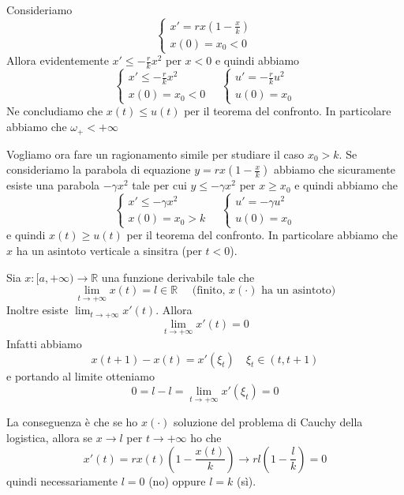 \begin{example}
    Consideriamo 
    \[
        \begin{cases}
        x' = rx\left( 1 - \frac{x}{k} \right)  \\
        x(0) = x_{0} < 0
        \end{cases}
    \]
    Allora evidentemente \(x' \le -\frac{r}{k} x^2\) per \(x < 0\) e quindi
    abbiamo
    \[
        \begin{cases}
            x' \le  -\frac{r}{k} x^2 \\
            x(0) = x_{0} < 0
        \end{cases}
        \quad 
        \begin{cases}
            u' =  -\frac{r}{k} u^2 \\
            u(0) = x_{0}
        \end{cases}
    \]
    Ne concludiamo che \(x(t) \le u(t)\) per il teorema del confronto. In
    particolare abbiamo che \(\omega_+ < +\infty\) 

    Vogliamo ora fare un ragionamento simile per studiare il caso \(x_{0} > k\).
    Se consideriamo la parabola di equazione \(y = rx(1-\frac{x}{k})\) abbiamo
    che sicuramente esiste una parabola \(-\gamma x^2\) tale per cui \(y \le
    -\gamma x^2  \) per \(x \ge x_{0}\) e quindi abbiamo che
    \[
        \begin{cases}
            x' \le -\gamma x^2 \\
            x(0) = x_{0} > k
        \end{cases}
        \quad
        \begin{cases}
            u' = -\gamma u^2 \\
            u(0) = x_{0}
        \end{cases}
    \]
    e quindi \(x(t) \ge u(t)\) per il teorema del confronto. In particolare
    abbiamo che \(x\) ha un asintoto verticale a sinsitra (per \(t < 0\)).
\end{example}
\begin{remark}
    Sia \(x : [a, +\infty) \to \mathbb{R}\) una funzione derivabile tale che 
    \[
        \lim_{t \to +\infty} x(t) = l \in \mathbb{R} \quad \text{ (finito,
        \(x(\cdot )\) ha un asintoto)}
    \]
    Inoltre esiste \(\lim_{t \to +\infty} x'(t)\). 
    Allora
    \[
        \lim_{t \to +\infty} x'(t) = 0
    \]
    Infatti abbiamo
    \[
        x(t + 1) - x(t) = x'(\xi_t) \quad \xi_t \in (t, t+1)
    \] e portando al limite otteniamo
    \[
        0 = l - l = \lim_{t \to +\infty} x'(\xi_t) = 0
    \]

    La conseguenza è che se ho \(x(\cdot )\) soluzione del problema di Cauchy
    della logistica, allora se \(x \to l\) per \(t \to +\infty\) ho che 
    \[
        x'(t) = rx(t)(1-\frac{x(t)}{k}) \to rl (1 - \frac{l}{k}) = 0
    \]
    quindi necessariamente \(l=0\) (no) oppure \(l=k\) (sì).
\end{remark}

